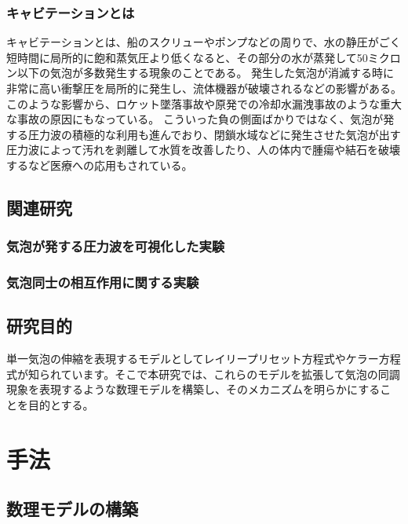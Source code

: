 \documentclass[11pt,a4j]{jreport}
\begin{document}
\subsection{キャビテーションとは} %
キャビテーションとは、船のスクリューやポンプなどの周りで、水の静圧がごく短時間に局所的に飽和蒸気圧より低くなると、その部分の水が蒸発して50ミクロン以下の気泡が多数発生する現象のことである。
発生した気泡が消滅する時に非常に高い衝撃圧を局所的に発生し、流体機器が破壊されるなどの影響がある。このような影響から、ロケット墜落事故や原発での冷却水漏洩事故のような重大な事故の原因にもなっている。
こういった負の側面ばかりではなく、気泡が発する圧力波の積極的な利用も進んでおり、閉鎖水域などに発生させた気泡が出す圧力波によって汚れを剥離して水質を改善したり、人の体内で腫瘍や結石を破壊するなど医療への応用もされている。

\section{関連研究}

\subsection{気泡が発する圧力波を可視化した実験}

\subsection{気泡同士の相互作用に関する実験}

\section{研究目的}
単一気泡の伸縮を表現するモデルとしてレイリープリセット方程式やケラー方程式が知られています。そこで本研究では、これらのモデルを拡張して気泡の同調現象を表現するような数理モデルを構築し、そのメカニズムを明らかにすることを目的とする。

\chapter{手法} %
%
\section{数理モデルの構築}
%
\end{document}
